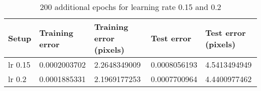 \begin{table}[h!]
\centering
\footnotesize
\begin{tabular}{|l|l|l|l|l|}
	\hline
		\textbf{Setup} & \textbf{Training error} & \textbf{Training error (pixels)} & \textbf{Test error} & \textbf{Test error (pixels)}\\
	\hline
		lr 0.15	& 0.0002003702%
				& 2.2648349009%
				& 0.0008056193%
				& 4.5413494949%
				\\
	\hline
		lr 0.2 	& 0.0001885331%
				& 2.1969177253%
				& 0.0007700964%
				& 4.4400977462%
				\\
	\hline
	\end{tabular}
	\normalsize
	\caption{200 additional epochs for learning rate 0.15 and 0.2}
	\label{tab:cnn_errors_learningrates_more_epochs}
\end{table}
